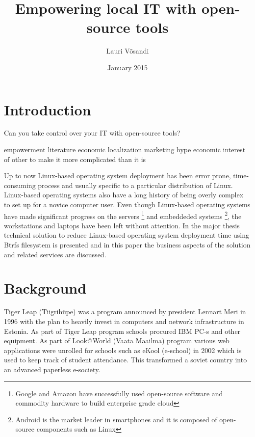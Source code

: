\documentclass{article}
\title{Empowering local IT with open-source tools}
\author{Lauri Võsandi}
\date{January 2015}
\begin{document}
\maketitle

\section{Introduction}

Can you take control over your IT with open-source tools?

empowerment literature
economic 
localization
marketing hype
economic interest of other to make it more complicated than it is

Up to now Linux-based operating system deployment has been
error prone, time-consuming process and usually specific to
a particular distribution of Linux.
Linux-based operating systems also have a long history
of being overly complex to set up for a novice computer user.
Even though Linux-based operating systems have made significant
progress on the servers
\footnote{Google and Amazon have successfully used open-source software
and commodity hardware to build enterprise grade cloud}
and embeddeded systems
\footnote{Android is the market leader in smartphones and it is composed of open-source components such as Linux},
the workstations and laptops have been left without attention.
In the major thesis technical solution to reduce
Linux-based operating system deployment time using
Btrfs filesystem is presented and in this paper the business aspects
of the solution and related services are discussed.


\section{Background}

Tiger Leap (Tiigrihüpe) was a program announced
by president Lennart Meri in 1996 with the plan to heavily invest
in computers and network infrastructure in Estonia.
As part of Tiger Leap program schools procured IBM PC-s and
other equipment.
As part of Look@World (Vaata Maailma) program
various web applications were unrolled for schools such as
eKool (e-school) in 2002 which is used to keep track of student attendance.
This transformed a soviet country into an advanced paperless e-society.
\end{document}
